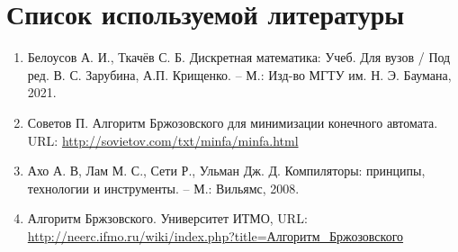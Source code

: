 \documentclass{bmstu-gost-7-32}
\begin{document}
\section*{Список используемой литературы}

\begin{enumerate}
	\item Белоусов А. И., Ткачёв С. Б. Дискретная математика: Учеб. Для вузов / Под ред. В. С. Зарубина, А.П. Крищенко. – М.: Изд-во МГТУ им. Н. Э. Баумана, 2021.
	\item Советов П. Алгоритм Бржозовского для минимизации конечного автомата. URL: \url{http://sovietov.com/txt/minfa/minfa.html}
	\item Ахо А. В, Лам М. С., Сети Р., Ульман Дж. Д. Компиляторы: принципы, технологии и инструменты. – М.: Вильямс, 2008.
	\item Алгоритм Бржзовского. Университет ИТМО, URL: \href{http://neerc.ifmo.ru/wiki/index.php?title=%
		\%D0\%90\%D0\%BB\%D0\%B3\%D0\%BE\%D1\%80\%D0\%B8\%D1\%82\%D0\%BC_%
		\%D0\%91\%D1\%80\%D0\%B6\%D0\%BE\%D0\%B7\%D0\%BE\%D0\%B2\%D1\%81\%D0\%BA\%D0\%BE\%D0\%B3\%D0\%BE}%
	{http://neerc.ifmo.ru/wiki/index.php?title=Алгоритм\_Бржозовского}
\end{enumerate}
\end{document}
